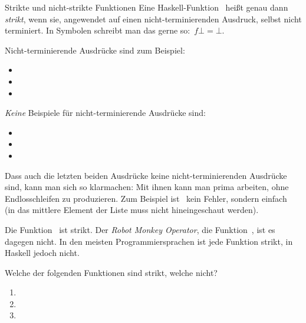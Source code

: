 \documentclass{uebblatt}
\begin{document}
\begin{aufgabe}{Strikte und nicht-strikte Funktionen}
Eine Haskell-Funktion~ heißt genau dann
\emph{strikt}, wenn sie, angewendet auf einen nicht-terminierenden Ausdruck,
selbst nicht terminiert. In Symbolen schreibt man das gerne
so:~$f \bot = \bot$.

Nicht-terminierende Ausdrücke sind zum Beispiel:
\begin{itemize}
\item {}
\item {}
\item {}
\end{itemize}
\emph{Keine} Beispiele für nicht-terminierende Ausdrücke sind:
\begin{itemize}
\item {}
\item \haskellinline{[0..]}
\item \haskellinline{['a', undefined, 'b']}
\end{itemize}
Dass auch die letzten beiden Ausdrücke keine nicht-terminierenden Ausdrücke
sind, kann man sich so klarmachen: Mit ihnen kann man prima arbeiten, ohne
Endlosschleifen zu produzieren. Zum Beispiel ist~ kein Fehler, sondern einfach~ (in das
mittlere Element der Liste muss nicht hineingeschaut werden).

Die Funktion~ ist strikt.
Der \emph{Robot Monkey Operator}, die Funktion~, ist es dagegen nicht. In den meisten Programmiersprachen ist jede
Funktion strikt, in Haskell jedoch nicht.

Welche der folgenden Funktionen sind strikt, welche nicht?
\begin{enumerate}
\item {}
\item {}
\item {}
\end{enumerate}
\end{aufgabe}
\end{document}
